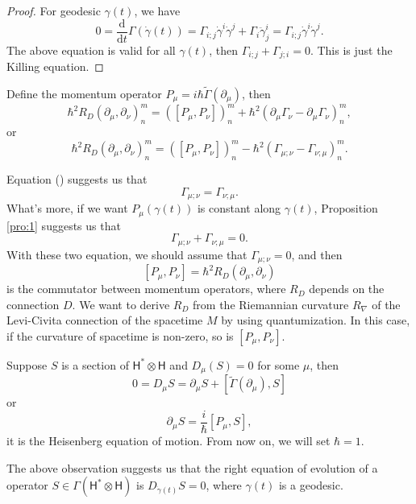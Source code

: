 \documentclass[12pt]{article}
\theoremstyle{definition}
\theoremstyle{plain}
\begin{document}
\begin{proof}
For geodesic $\gamma(t)$, we have
\[
	0=\frac{\mathrm d}{\mathrm dt}\Gamma(\dot\gamma(t))=\Gamma_{i;j}\dot\gamma^i\dot\gamma^j+\Gamma_{i}\ddot\gamma_{j}^i=\Gamma_{i;j}\dot\gamma^i\dot\gamma^j.
\]
The above equation is valid for all $\gamma(t)$, then $\Gamma_{i;j}+\Gamma_{j;i}=0$. This is just the Killing equation.
\end{proof}

Define the momentum operator $P_\mu=i\hbar \widetilde{\Gamma}(\partial_\mu)$, then
\[
	\hbar^2 R_D(\partial_\mu,\partial_\nu)^m_n=([P_\mu,P_\nu])^m_n+\hbar^2(\partial_\mu\Gamma_\nu - \partial_\mu\Gamma_\nu)^m_n,
\]
or
\begin{equation}
	\hbar^2 R_D(\partial_\mu,\partial_\nu)^m_n=([P_\mu,P_\nu])^m_n-\hbar^2(\Gamma_{\mu;\nu} - \Gamma_{\nu;\mu})^m_n.
\end{equation}

Equation (\theequation) suggests us that
\[
	\Gamma_{\mu;\nu}=\Gamma_{\nu;\mu}.
\]
What's more, if we want $P_\mu(\gamma(t))$ is constant along $\gamma(t)$, Proposition \ref{pro:1} suggests us that
\[
	\Gamma_{\mu;\nu}+\Gamma_{\nu;\mu}=0.
\]
With these two equation, we should assume that $\Gamma_{\mu;\nu}=0$, and then
\[
	[P_\mu,P_\nu]=\hbar^2 R_D(\partial_\mu,\partial_\nu)
\]
is the commutator between momentum operators, where $R_D$ depends on the connection $D$. We want to derive $R_D$ from the Riemannian curvature $R_\nabla$ of the Levi-Civita connection of the spacetime $M$ by using quantumization. In this case, if the curvature of spacetime is non-zero, so is $[P_\mu,P_\nu]$.

Suppose $S$ is a section of $\mathsf{H}^*\otimes \mathsf{H}$ and $D_\mu(S)=0$ for some $\mu$, then
\[
	0=D_\mu S= \partial_\mu S+[\widetilde{\Gamma}(\partial_\mu),S]
\]
or
\[
	\partial_\mu S=\frac{i}{\hbar}[P_\mu,S],
\]
it is the Heisenberg equation of motion. From now on, we will set $\hbar=1$.

The above observation suggests us that the right equation of evolution of a operator $S\in \Gamma (\mathsf{H}^*\otimes \mathsf{H})$ is $D_{\dot\gamma(t)}S=0$, where $\gamma(t)$ is a geodesic.


\end{document}
